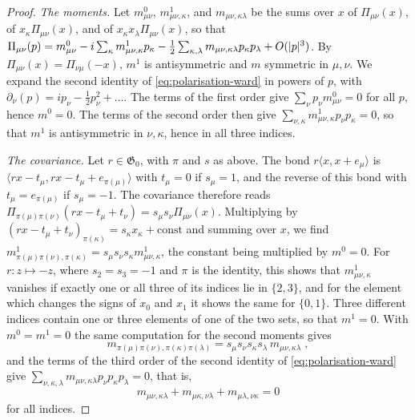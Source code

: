 \documentclass[11pt]{preprint}
\DeclarePairedDelimiter{\abs}{\lvert}{\rvert}
\numberwithin{equation}{section}
\theoremstyle{definition}
\theoremstyle{remark}
\theoremstyle{plain}
\begin{document}
\begin{proof}
\emph{The moments.} Let $m^0_{\mu\nu}$, $m^1_{\mu\nu,\kappa}$, and $m_{\mu\nu,\kappa\lambda}$ be the sums over $x$ of $\Pi_{\mu\nu}(x)$, of $x_\kappa\Pi_{\mu\nu}(x)$, and of $x_\kappa x_\lambda\Pi_{\mu\nu}(x)$, so that $\Pi_{\mu\nu}(p) = m^0_{\mu\nu} - i\sum_\kappa m^1_{\mu\nu,\kappa}p_\kappa - \frac12\sum_{\kappa,\lambda}m_{\mu\nu,\kappa\lambda}p_\kappa p_\lambda + O(\abs p^3)$. By $\Pi_{\mu\nu}(x) = \Pi_{\nu\mu}(-x)$, $m^1$ is antisymmetric and $m$ symmetric in $\mu, \nu$. We expand the second identity of \eqref{eq:polarisation-ward} in powers of $p$, with $\partial_\nu(p) = ip_\nu - \frac12p_\nu^2 + \dots$. The terms of the first order give $\sum_\nu p_\nu m^0_{\mu\nu} = 0$ for all $p$, hence $m^0 = 0$. The terms of the second order then give $\sum_{\nu,\kappa}m^1_{\mu\nu,\kappa}p_\nu p_\kappa = 0$, so that $m^1$ is antisymmetric in $\nu, \kappa$, hence in all three indices.

\emph{The covariance.} Let $r \in \mathfrak G_0$, with $\pi$ and $s$ as above. The bond $r\langle x, x + e_\mu\rangle$ is $\langle rx - t_\mu, rx - t_\mu + e_{\pi(\mu)}\rangle$ with $t_\mu = 0$ if $s_\mu = 1$, and the reverse of this bond with $t_\mu = e_{\pi(\mu)}$ if $s_\mu = -1$. The covariance therefore reads $\Pi_{\pi(\mu)\pi(\nu)}(rx - t_\mu + t_\nu) = s_\mu s_\nu\Pi_{\mu\nu}(x)$. Multiplying by $(rx - t_\mu + t_\nu)_{\pi(\kappa)} = s_\kappa x_\kappa + \mathrm{const}$ and summing over $x$, we find $m^1_{\pi(\mu)\pi(\nu),\pi(\kappa)} = s_\mu s_\nu s_\kappa m^1_{\mu\nu,\kappa}$, the constant being multiplied by $m^0 = 0$. For $r \colon z \mapsto -z$, where $s_2 = s_3 = -1$ and $\pi$ is the identity, this shows that $m^1_{\mu\nu,\kappa}$ vanishes if exactly one or all three of its indices lie in $\{ 2, 3 \}$, and for the element which changes the signs of $x_0$ and $x_1$ it shows the same for $\{ 0, 1 \}$. Three different indices contain one or three elements of one of the two sets, so that $m^1 = 0$. With $m^0 = m^1 = 0$ the same computation for the second moments gives
\begin{equation}\label{eq:moment-covariance}
    m_{\pi(\mu)\pi(\nu),\pi(\kappa)\pi(\lambda)} = s_\mu s_\nu s_\kappa s_\lambda\,m_{\mu\nu,\kappa\lambda}\;,
\end{equation}
and the terms of the third order of the second identity of \eqref{eq:polarisation-ward} give $\sum_{\nu,\kappa,\lambda}m_{\mu\nu,\kappa\lambda}p_\nu p_\kappa p_\lambda = 0$, that is,
\begin{equation}\label{eq:moment-cyclic}
    m_{\mu\nu,\kappa\lambda} + m_{\mu\kappa,\nu\lambda} + m_{\mu\lambda,\nu\kappa} = 0
\end{equation}
for all indices.


\end{proof}
\end{document}
